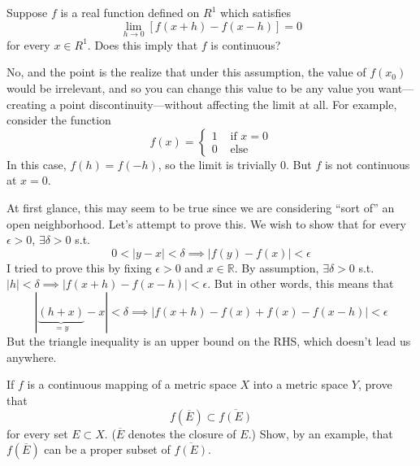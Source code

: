   \begin{exercise}[Rudin 4.1]
    Suppose $f$ is a real function defined on $R^1$ which satisfies
    \begin{equation}
      \lim_{h \to 0} [f(x + h) - f(x - h)] = 0
    \end{equation}
    for every $x \in R^1$. Does this imply that $f$ is continuous?
  \end{exercise}
  \begin{solution}
    No, and the point is the realize that under this assumption, the value of $f(x_0)$ would be irrelevant, and so you can change this value to be any value you want---creating a point discontinuity---without affecting the limit at all. For example, consider the function 
    \begin{equation}
      f(x) = \begin{cases} 
        1 & \text{ if } x = 0 \\ 
        0 & \text{ else} 
      \end{cases}
    \end{equation} 
    In this case, $f(h) = f(-h)$, so the limit is trivially $0$. But $f$ is not continuous at $x = 0$.
    
    At first glance, this may seem to be true since we are considering ``sort of'' an open neighborhood. Let's attempt to prove this. We wish to show that for every $\epsilon > 0$, $\exists \delta > 0$ s.t. 
    \begin{equation}
      0 < |y - x| < \delta \implies |f(y) - f(x)| < \epsilon
    \end{equation}
    I tried to prove this by fixing $\epsilon > 0$ and $x \in \mathbb{R}$. By assumption, $\exists \delta > 0$ s.t. $|h| < \delta \implies |f(x + h) - f(x - h)| < \epsilon$. But in other words, this means that 
    \begin{equation}
      |\underbrace{(h + x)}_{=y} - x| < \delta \implies |f(x + h) - f(x) + f(x) - f(x - h)| < \epsilon
    \end{equation}
    But the triangle inequality is an upper bound on the RHS, which doesn't lead us anywhere. 
  \end{solution}

  \begin{exercise}[Rudin 4.2]
    If $f$ is a continuous mapping of a metric space $X$ into a metric space $Y$, prove that
    \begin{equation}
      f(\overline{E}) \subset \overline{f(E)}
    \end{equation}
    for every set $E \subset X$. ($\overline{E}$ denotes the closure of $E$.) Show, by an example, that $f(\overline{E})$ can be a proper subset of $\overline{f(E)}$.
  \end{exercise}
  \begin{solution}

  \end{solution}

